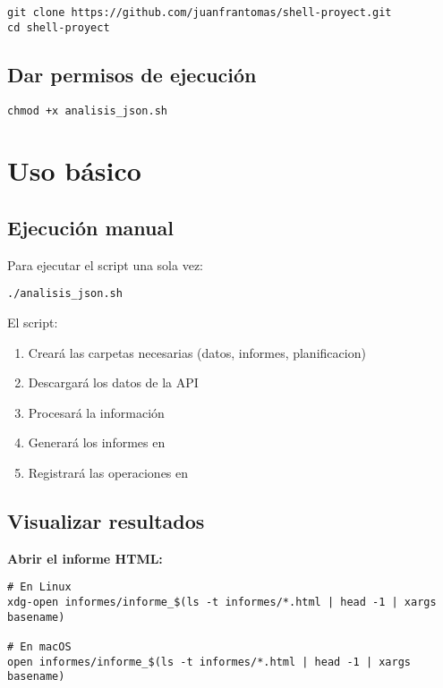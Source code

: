 \begin{lstlisting}[style=bash]
git clone https://github.com/juanfrantomas/shell-proyect.git
cd shell-proyect
\end{lstlisting}

\subsection{Dar permisos de ejecución}

\begin{lstlisting}[style=bash]
chmod +x analisis_json.sh
\end{lstlisting}

\section{Uso básico}

\subsection{Ejecución manual}

Para ejecutar el script una sola vez:

\begin{lstlisting}[style=bash]
./analisis_json.sh
\end{lstlisting}

El script:
\begin{enumerate}
  \item Creará las carpetas necesarias (datos, informes, planificacion)
  \item Descargará los datos de la API
  \item Procesará la información
  \item Generará los informes en 
  \item Registrará las operaciones en 
\end{enumerate}

\subsection{Visualizar resultados}

\textbf{Abrir el informe HTML:}
\begin{lstlisting}[style=bash]
# En Linux
xdg-open informes/informe_$(ls -t informes/*.html | head -1 | xargs basename)

# En macOS
open informes/informe_$(ls -t informes/*.html | head -1 | xargs basename)
\end{lstlisting}

